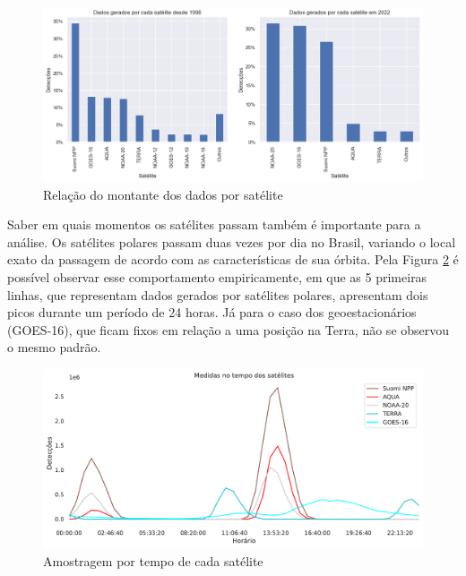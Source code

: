 \documentclass[cic,tc]{iiufrgs}
\begin{document}
\begin{figure}[H]
    \caption{Relação do montante dos dados por satélite}
    \begin{center}
        \includegraphics[width=35em]{porcentagem_satelites}
    \end{center}
    \label{fig:porcentagem_satelites}
\end{figure}

Saber em quais momentos os satélites passam também é importante para a análise. 
Os satélites polares passam duas vezes por dia no Brasil, variando o local 
exato da passagem de acordo com as características de sua órbita. Pela  
Figura \ref{fig:tempo_medidas_satelites} é possível observar esse comportamento 
empiricamente, em que as 5 primeiras linhas, que representam dados gerados por 
satélites polares, apresentam dois picos durante um período de 24 horas. Já para o  
caso dos geoestacionários (GOES-16), que ficam fixos em relação a uma posição 
na Terra, não se observou o mesmo padrão. \par

\begin{figure}[H]
    \caption{Amostragem por tempo de cada satélite}
    \begin{center}
        \includegraphics[width=35em]{tempo_medidas_satelites}
    \end{center}
    \label{fig:tempo_medidas_satelites}
\end{figure}
\end{document}
